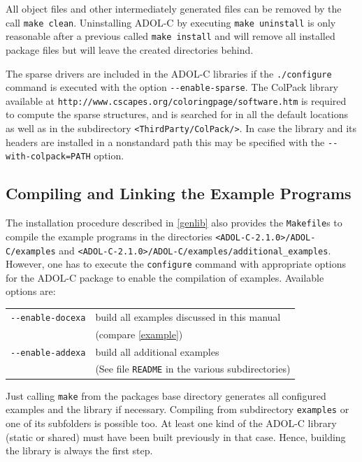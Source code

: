 \documentclass[11pt,twoside]{article}
\begin{document}
All object files and other intermediately generated files can be
removed by the call \verb=make clean=. Uninstalling ADOL-C by
executing \verb=make uninstall= is only reasonable after a previous
called \verb=make install= and will remove all installed package files
but will leave the created directories behind. 

The sparse drivers are included in the ADOL-C libraries if the
\verb=./configure= command is executed with the option
\verb=--enable-sparse=. The ColPack library available at 
\verb=http://www.cscapes.org/coloringpage/software.htm= is required to
compute the sparse structures, and is searched for in all the default 
locations as well as in the subdirectory \verb=<ThirdParty/ColPack/>=.
In case the library and its headers are installed in a nonstandard path
this may be specified with the \verb?--with-colpack=PATH? option.
% 
\subsection{Compiling and Linking the Example Programs}
%
The installation procedure described in \autoref{genlib} also
provides the \verb=Makefile=s  to compile the example
programs in the directories \verb=<ADOL-C-2.1.0>/ADOL-C/examples= and
\verb=<ADOL-C-2.1.0>/ADOL-C/examples/additional_examples=. However,
one has to execute the 
\verb=configure= command with  appropriate options for the ADOL-C package to enable the compilation of
examples. Available options are: 
\begin{center}
\begin{tabular}[t]{ll}
\verb=--enable-docexa=&build all examples discussed in this manual\\
&(compare \autoref{example})\\
\verb=--enable-addexa=&build all additional examples\\
&(See file \verb=README= in the various subdirectories)
\end{tabular}
\end{center}

Just calling \verb=make= from the packages base directory generates
all configured examples and the library if necessary. Compiling from
subdirectory \verb=examples= or one of its subfolders is possible
too. At least one kind of the ADOL-C library (static or shared) must
have been built previously in that case. Hence, building the library
is always the first step. 
\end{document}
